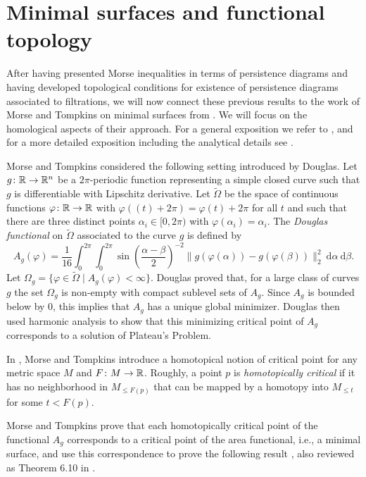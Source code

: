 
\section{Minimal surfaces and functional topology} \label{s:surfaces}

After having presented Morse inequalities in terms of persistence diagrams and having developed topological conditions for existence of persistence diagrams associated to filtrations, we will now connect these previous results to the work of Morse and Tompkins on minimal surfaces from \cite{Morse.1939}.
We will focus on the homological aspects of their approach.
For a general exposition we refer to \cite[Sections 4.3-5]{Bott.1980}, and for a more detailed exposition including the analytical details see \cite[Section II.6]{Struwe.1988}.

Morse and Tompkins considered the following setting introduced by Douglas.
Let $g \colon \mathbb{R} \to \mathbb{R}^n$ be a $2\pi$-periodic function representing a simple closed curve such that $g$ is differentiable with Lipschitz derivative.
Let $\widetilde{\Omega}$ be the space of continuous functions $\varphi \colon \mathbb{R} \to \mathbb{R}$ with $\varphi((t)+2\pi) = \varphi(t) + 2\pi$ for all $t$ and such that there are three distinct points $\alpha_i \in [0,2\pi)$ with $\varphi(\alpha_i)=\alpha_i$.
The \emph{Douglas functional} on $\widetilde \Omega$ associated to the curve $g$ is defined by
\begin{equation*}
A_g(\varphi)=\frac{1}{16}\int_0^{2\pi}\int_0^{2\pi}\sin\left(\frac{\alpha-\beta}{2}\right)^{-2} \! \lVert g(\varphi(\alpha))-g(\varphi(\beta)) \rVert_2^2 \ \mathrm{d}\alpha \ \mathrm{d}\beta.
\end{equation*}
Let $\Omega_g=\{\varphi\in\widetilde\Omega\mid A_g(\varphi)<\infty\}$.
Douglas proved that, for a large class of curves $g$ the set $\Omega_g$ is non-empty with compact sublevel sets of $A_g$.
Since $A_g$ is bounded below by $0$, this implies that $A_g$ has a unique global minimizer.
Douglas then used harmonic analysis to show that this minimizing critical point of $A_g$ corresponds to a solution of Plateau's Problem.

In \cite[p.~445]{Morse.1939}, Morse and Tompkins introduce a homotopical notion of critical point for any metric space $M$ and $F \colon M \to \mathbb{R}$.
Roughly, a point $p$ is \emph{homotopically critical} if it has no neighborhood in $M_{\leq F(p)}$ that can be mapped by a homotopy into $M_{\leq t}$ for some $t<F(p)$.

Morse and Tompkins prove that each homotopically critical point of the functional $A_g$ corresponds to a critical point of the area functional, i.e., a minimal surface, and use this correspondence to prove the following result \cite[p.~447]{Morse.1939}, also reviewed as Theorem 6.10 in \cite{Struwe.1988}.

